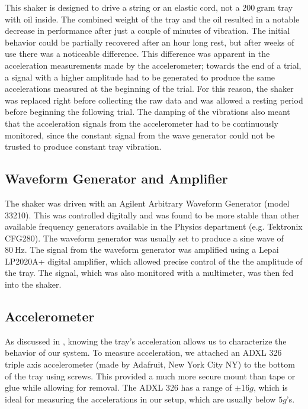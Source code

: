     This shaker is designed to drive a string or an elastic cord, not a $200~\mathrm{gram}$ tray with oil inside. The combined weight of the tray and the oil resulted in a notable decrease in performance after just a couple of minutes of vibration. The initial behavior could be partially recovered after an hour long rest, but after weeks of use there was a noticeable difference. This difference was apparent in the acceleration measurements made by the accelerometer; towards the end of a trial, a signal with a higher amplitude had to be generated to produce the same accelerations measured at the beginning of the trial. For this reason, the shaker was replaced right before collecting the raw data and was allowed a resting period before beginning the following trial. The damping of the vibrations also meant that the acceleration signals from the accelerometer had to be continuously  monitored, since the constant signal from the wave generator could not be trusted to produce constant tray vibration. 
    
\subsection{Waveform Generator and Amplifier}
    The shaker was driven with an Agilent Arbitrary Waveform Generator (model 33210). This was controlled digitally and was found to be more stable than other available frequency generators available in the Physics department (e.g. Tektronix CFG280). The waveform generator was usually set to produce a sine wave of $80~\mathrm{Hz}$. The signal from the waveform generator was amplified using a Lepai LP2020A+ digital amplifier, which allowed precise control of the the amplitude of the tray. The signal, which was also monitored with a multimeter, was then fed into the shaker.    
            
\subsection{Accelerometer}  
    As discussed in , knowing the tray's acceleration allows us to characterize the behavior of our system. To measure acceleration, we attached an ADXL 326 triple axis accelerometer (made by Adafruit, New York City NY) to the bottom of the tray using screws. This provided a much more secure mount than tape or glue while allowing for removal. The ADXL 326 has a range of $\pm$16$g$, which is ideal for measuring the accelerations in our setup, which are usually below $5g$'s. 
      
